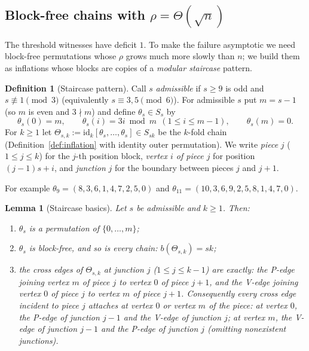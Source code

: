 \documentclass[11pt]{article}
\newtheorem{lemma}[theorem]{Lemma}
\theoremstyle{definition}
\newtheorem{definition}[theorem]{Definition}
\begin{document}
\subsection{Block-free chains with \texorpdfstring{$\rho = \Theta(\sqrt n)$}{rho =
Theta(sqrt n)}}

The threshold witnesses have deficit $1$. To make the failure asymptotic we need
block-free permutations whose $\rho$ grows much more slowly than $n$; we build them as
inflations whose blocks are copies of a \emph{modular staircase} pattern.

\begin{definition}[Staircase pattern]\label{def:stair}
Call $s$ \emph{admissible} if $s \ge 9$ is odd and $s \not\equiv 1 \pmod 3$
(equivalently $s \equiv 3, 5 \pmod 6$). For admissible $s$ put $m = s - 1$ (so $m$ is
even and $3 \nmid m$) and define $\theta_s \in S_s$ by
\[
\theta_s(0) = m, \qquad \theta_s(i) = 3i \bmod m \ \ (1 \le i \le m-1), \qquad
\theta_s(m) = 0 .
\]
For $k \ge 1$ let $\Theta_{s,k} := \mathrm{id}_k[\theta_s, \dots, \theta_s] \in S_{sk}$
be the $k$-fold chain (Definition~\ref{def:inflation} with identity outer
permutation). We write \emph{piece} $j$ ($1 \le j \le k$) for the $j$-th position
block, \emph{vertex $i$ of piece $j$} for position $(j-1)s + i$, and \emph{junction}
$j$ for the boundary between pieces $j$ and $j+1$.
\end{definition}

For example $\theta_9 = (8,3,6,1,4,7,2,5,0)$ and
$\theta_{11} = (10,3,6,9,2,5,8,1,4,7,0)$.

\begin{lemma}[Staircase basics]\label{lem:stair}
Let $s$ be admissible and $k \ge 1$. Then:
\begin{enumerate}
\item[(a)] $\theta_s$ is a permutation of $\{0, \dots, m\}$;
\item[(b)] $\theta_s$ is block-free, and so is every chain:
$b(\Theta_{s,k}) = sk$;
\item[(c)] the cross edges of $\Theta_{s,k}$ at junction $j$ ($1 \le j \le k-1$) are
exactly: the P-edge joining vertex $m$ of piece $j$ to vertex $0$ of piece $j+1$, and
the V-edge joining vertex $0$ of piece $j$ to vertex $m$ of piece $j+1$. Consequently
every cross edge incident to piece $j$ attaches at vertex $0$ or vertex $m$ of the
piece: at vertex $0$, the P-edge of junction $j-1$ and the V-edge of junction $j$; at
vertex $m$, the V-edge of junction $j-1$ and the P-edge of junction $j$ (omitting
nonexistent junctions).
\end{enumerate}
\end{lemma}
\end{document}
